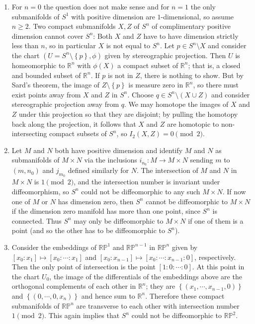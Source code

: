 \documentclass[11pt,leqno]{article}
\theoremstyle{plain}
\theoremstyle{definition}
\numberwithin{equation}{section}
\numberwithin{lem}{section}
\newcommand{\cbr}[1]{\left\{#1\right\}}
\begin{document}
\begin{enumerate}
\begin{enumerate}
        \item For $n = 0$ the question does not make sense and for $n = 1$ the only submanifolds of $S^1$ with positive dimension are $1$-dimensional, so assume $n\geq 2$. Two compact submanifolds $X,Z$ of $S^n$ of complimentary positive dimension cannot cover $S^n$: Both $X$ and $Z$ have to have dimension strictly less than $n$, so in particular $X$ is not equal to $S^n$. Let $p\in S^n\setminus X$ and consider the chart $(U = S^n\setminus \cbr{p},\phi)$ given by stereographic projection. Then $U$ is homeomorphic to $\mathbb R^n$ with $\phi(X)$ a compact subset of $\mathbb R^n$; that is, a closed and bounded subset of $\mathbb R^n$. If $p$ is not in $Z$, there is nothing to show. But by Sard's theorem, the image of $Z\setminus \cbr{p}$ is measure zero in $\mathbb R^n$, so there must exist points away from $X$ and $Z$ in $S^n$. Choose $q\in S^n\setminus (X\cup Z)$ and consider stereographic projection away from $q$. We may homotope the images of $X$ and $Z$ under this projection so that they are disjoint; by pulling the homotopy back along the projection, it follows that $X$ and $Z$ are homotopic to non-intersecting compact subsets of $S^n$, so $I_2(X,Z) = 0\pmod 2$.
        \item Let $M$ and $N$ both have positive dimension and identify $M$ and $N$ as submanifolds of $M\times N$ via the inclusions $i_{n_0}\colon M \to M\times N$ sending $m$ to $(m,n_0)$ and $j_{m_0}$ defined similarly for $N$. The intersection of $M$ and $N$ in $M\times N$ is $1\pmod 2$, and the intersection number is invariant under diffeomorphism, so $S^n$ could not be diffeomorphic to any such $M\times N$. If now one of $M$ or $N$ has dimension zero, then $S^n$ cannot be diffeomorphic to $M\times N$ if the dimension zero manifold has more than one point, since $S^n$ is connected. Thus $S^n$ may only be diffeomorphic to $M\times N$ if one of them is a point (and so the other has to be diffeomorphic to $S^n$).
        \item Consider the embeddings of $\mathbb {RP}^1$ and $\mathbb {RP}^{n-1}$ in $\mathbb {RP}^n$ given by $[x_0:x_1]\mapsto [x_0:\cdots:x_1]$ and $[x_0:x_{n-1}]\mapsto [x_0:\cdots:x_{n-1}:0]$, respectively. Then the only point of intersection is the point $[1:0:\cdots:0]$. At this point in the chart $U_0$, the image of the differentials of the embeddings above are the orthogonal complements of each other in $\mathbb R^n$; they are $\cbr{(x_1,\cdots,x_{n-1},0)}$ and $\cbr{(0,\cdots,0,x_n)}$ and hence sum to $\mathbb R^n$. Therefore these compact submanifolds of $\mathbb {RP}^n$ are transverse to each other with intersection number $1\pmod 2$. This again implies that $S^n$ could not be diffeomorphic to $\mathbb {RP}^2$.

\end{enumerate}
\end{enumerate}
\end{document}
